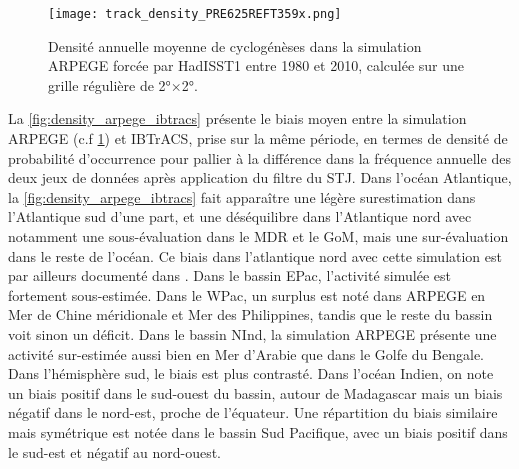 \documentclass[../main.tex]{subfiles}
\begin{document}
\begin{figure}[tb]
    \centering
    \texttt{[image: track\_density\_PRE625REFT359x.png]}
    \caption{Densité annuelle moyenne de cyclogénèses dans la simulation ARPEGE forcée par HadISST1 entre 1980 et 2010, calculée sur une grille régulière de
    \ang{2}$\times$\ang{2}.}
    \label{fig:track_density_PRE625REFT359x}
\end{figure}

La \cref{fig:density_arpege_ibtracs} présente le biais moyen entre la simulation ARPEGE (c.f \cref{fig:track_density_PRE625REFT359x}) et IBTrACS, prise sur la
même période, en termes de densité de probabilité d'occurrence pour pallier à la différence dans la fréquence annuelle des deux jeux de données après
application du filtre du STJ. Dans l'océan Atlantique, la \cref{fig:density_arpege_ibtracs} fait apparaître une légère surestimation dans l'Atlantique sud d'une
part, et une déséquilibre dans l'Atlantique nord avec notamment une sous-évaluation dans le MDR et le GoM, mais une sur-évaluation dans le reste de l'océan. Ce
biais dans l'atlantique nord avec cette simulation est par ailleurs documenté dans \textcite{chauvin_future_2020}. Dans le bassin EPac, l'activité simulée est
fortement sous-estimée. Dans le WPac, un surplus est noté dans ARPEGE en Mer de Chine méridionale et Mer des Philippines, tandis que le reste du bassin voit
sinon un déficit. Dans le bassin NInd, la simulation ARPEGE présente une activité sur-estimée aussi bien en Mer d'Arabie que dans le Golfe du Bengale. Dans
l'hémisphère sud, le biais est plus contrasté. Dans l'océan Indien, on note un biais positif dans le sud-ouest du bassin, autour de Madagascar mais un biais
négatif dans le nord-est, proche de l'équateur. Une répartition du biais similaire mais symétrique est notée dans le bassin Sud Pacifique, avec un biais positif
dans le sud-est et négatif au nord-ouest.
\end{document}
